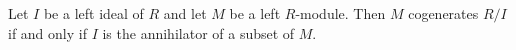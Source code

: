 Let $I$ be a left ideal of $R$ and let $M$ be a left $R$-module. Then $M$ cogenerates $R/I$ if and only if $I$ is the annihilator of a subset of $M$.
